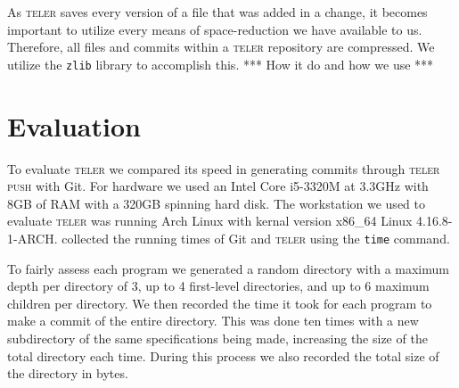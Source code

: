 \documentclass[12pt, letterpaper]{article}
\begin{document}
As \textsc{teler} saves every version of a file that was added in a change, it
becomes important to utilize every means of space-reduction we have available to
us. Therefore, all files and commits within a \textsc{teler} repository are
compressed. We utilize the \texttt{zlib} library to accomplish this. *** How it
do and how we use ***



\section{Evaluation}
\label{sec:evaluation}
To evaluate \textsc{teler} we compared its speed in generating commits
through \textsc{teler push} with Git. For hardware we used an Intel
Core i5-3320M at 3.3GHz with 8GB of RAM with a 320GB spinning hard
disk. The workstation we used to evaluate \textsc{teler} was running
Arch Linux with kernal version x86\_64 Linux 4.16.8-1-ARCH.\@We
collected the running times of Git and \textsc{teler} using the
\texttt{time} command.

To fairly assess each program we generated a random directory with a
maximum depth per directory of 3, up to 4 first-level directories, and
up to 6 maximum children per directory. We then recorded the time it
took for each program to make a commit of the entire directory. This
was done ten times with a new subdirectory of the same specifications
being made, increasing the size of the total directory each time.
During this process we also recorded the total size of the directory
in bytes.
\end{document}
